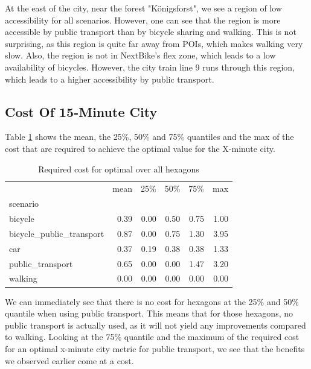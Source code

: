 At the east of the city, near the forest "Königsforst", we see a region of low accessibility for all scenarios.
However, one can see that the region is more accessible by public transport than by bicycle sharing and walking.
This is not surprising, as this region is quite far away from POIs, which makes walking very slow. 
Also, the region is not in NextBike's flex zone, which leads to a low availability of bicycles.
However, the city train line 9 runs through this region, which leads to a higher accessibility by public transport.




\subsection{Cost Of 15-Minute City}
\label{subsec:cost_of_15_minute_city}

Table \ref{tab:required_cost} shows the mean, the 25\%, 50\% and 75\% quantiles and the max of the cost that are required to achieve the optimal value for the X-minute city.

\begin{table}
  \caption{Required cost for optimal over all hexagons}
  \label{tab:required_cost}
  \begin{center}
    \begin{tabular}{lrrrrr}
     & mean & 25\% & 50\% & 75\% & max \\
    scenario &  &  &  &  &  \\
    bicycle & 0.39 & 0.00 & 0.50 & 0.75 & 1.00 \\
    bicycle_public_transport & 0.87 & 0.00 & 0.75 & 1.30 & 3.95 \\
    car & 0.37 & 0.19 & 0.38 & 0.38 & 1.33 \\
    public_transport & 0.65 & 0.00 & 0.00 & 1.47 & 3.20 \\
    walking & 0.00 & 0.00 & 0.00 & 0.00 & 0.00 \\
    \end{tabular}
  \end{center}
\end{table}

We can immediately see that there is no cost for hexagons at the 25\% and 50\% quantile when using public transport.
This means that for those hexagons, no public transport is actually used, as it will not yield any improvements compared to walking.
Looking at the 75\% quantile and the maximum of the required cost for an optimal x-minute city metric for public transport, we see that the benefits we observed earlier come at a cost.

